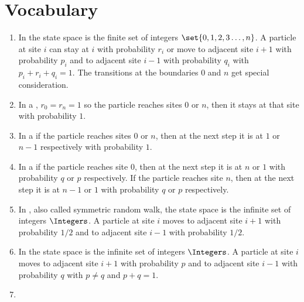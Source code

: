 \documentclass[12pt]{article}
\begin{document}
\hr

\section*{Vocabulary}
\begin{enumerate}
    \item
        In  the state space is the
        finite set of integers \( \set{0, 1, 2, 3 \dots, n} \).  A
        particle at site \( i \) can stay at \( i \) with probability \(
        r_i \) or move to adjacent site \( i+1 \) with probability \( p_i
        \) and to adjacent site \( i-1 \) with probability \( q_i \)
        with \( p_i+r_i+q_i = 1 \).  The transitions at the boundaries \(
        0 \) and \( n \) get special consideration.
    \item
        In a , \( r_0 = r_n
        = 1 \) so the particle reaches sites \( 0 \) or \( n \), then it
        stays at that site with probability \( 1 \).
    \item
        In a  if the
        particle reaches sites \( 0 \) or \( n \), then at the next step
        it is at \( 1 \) or \( n-1 \) respectively with probability \( 1
        \).
    \item
        In a  if the particle reaches site
        \( 0 \), then at the next step it is at \( n \) or \( 1 \) with
        probability \( q \) or \( p \) respectively.  If the particle
        reaches site \( n \), then at the next step it is at \( n-1 \)
        or \( 1 \) with probability \( q \) or \( p \) respectively.
    \item
        In , also called
        symmetric random walk, the state space is the infinite set of
        integers \( \Integers \).  A particle at site \( i \) moves to
        adjacent site \( i+1 \) with probability \( 1/2 \) and to
        adjacent site \( i-1 \) with probability \( 1/2 \).
    \item
        In  the state space is
        the infinite set of integers \( \Integers \).  A particle at
        site \( i \) moves to adjacent site \( i+1 \) with probability \(
        p \) and to adjacent site \( i-1 \) with probability \( q \)
        with \( p \ne q \) and \( p+q = 1 \).
    \item

\end{enumerate}
\end{document}
